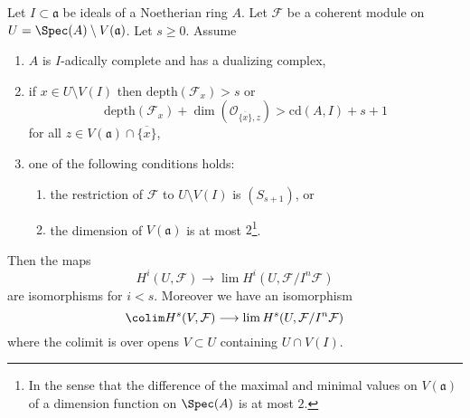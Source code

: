 \begin{proposition}
\label{proposition-application-higher}
Let $I \subset \mathfrak a$ be ideals of a Noetherian ring $A$.
Let $\mathcal{F}$ be a coherent module on
$U = \Spec(A) \setminus V(\mathfrak a)$.
Let $s \geq 0$.
Assume
\begin{enumerate}
\item $A$ is $I$-adically complete and has a dualizing complex,
\item if $x \in U \setminus V(I)$ then
$\text{depth}(\mathcal{F}_x) > s$ or
$$
\text{depth}(\mathcal{F}_x) +
\dim(\mathcal{O}_{\overline{\{x\}}, z}) > \text{cd}(A, I) + s + 1
$$
for all $z \in V(\mathfrak a) \cap \overline{\{x\}}$,
\item one of the following conditions holds:
\begin{enumerate}
\item the restriction of $\mathcal{F}$ to $U \setminus V(I)$
is $(S_{s + 1})$, or
\item the dimension of $V(\mathfrak a)$ is at most $2$\footnote{In
the sense that the difference of the maximal and minimal values
on $V(\mathfrak a)$ of a dimension function on $\Spec(A)$ is at most $2$.}.
\end{enumerate}
\end{enumerate}
Then the maps
$$
H^i(U, \mathcal{F})
\longrightarrow
\lim H^i(U, \mathcal{F}/I^n\mathcal{F})
$$
are isomorphisms for $i < s$. Moreover we have an isomorphism
$$
\colim H^s(V, \mathcal{F})
\longrightarrow
\lim H^s(U, \mathcal{F}/I^n\mathcal{F})
$$
where the colimit is over opens $V \subset U$ containing $U \cap V(I)$.
\end{proposition}

